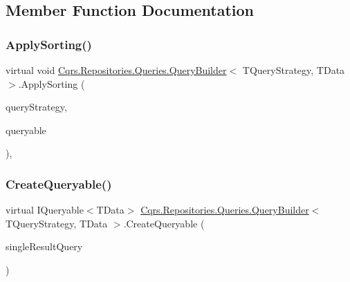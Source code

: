\subsection{Member Function Documentation}
\mbox{\label{classCqrs_1_1Repositories_1_1Queries_1_1QueryBuilder_aea4b78b2633babfaea0862f2a365c7d3}} 
\subsubsection{\texorpdfstring{Apply\+Sorting()}{ApplySorting()}}
{\footnotesize\ttfamily virtual void \hyperlink{classCqrs_1_1Repositories_1_1Queries_1_1QueryBuilder}{Cqrs.\+Repositories.\+Queries.\+Query\+Builder}$<$ T\+Query\+Strategy, T\+Data $>$.Apply\+Sorting (\begin{DoxyParamCaption}\item[{T\+Query\+Strategy}]{query\+Strategy,  }\item[{ref I\+Queryable$<$ T\+Data $>$}]{queryable }\end{DoxyParamCaption})\hspace{0.3cm}{\ttfamily [protected]}, {\ttfamily [virtual]}}

\mbox{\label{classCqrs_1_1Repositories_1_1Queries_1_1QueryBuilder_a6b103726f538e81ca0489a51b1aa3c88}} 
\subsubsection{\texorpdfstring{Create\+Queryable()}{CreateQueryable()}\hspace{0.1cm}{\footnotesize\ttfamily [1/2]}}
{\footnotesize\ttfamily virtual I\+Queryable$<$T\+Data$>$ \hyperlink{classCqrs_1_1Repositories_1_1Queries_1_1QueryBuilder}{Cqrs.\+Repositories.\+Queries.\+Query\+Builder}$<$ T\+Query\+Strategy, T\+Data $>$.Create\+Queryable (\begin{DoxyParamCaption}\item[{\hyperlink{interfaceCqrs_1_1Repositories_1_1Queries_1_1ISingleResultQuery}{I\+Single\+Result\+Query}$<$ T\+Query\+Strategy, T\+Data $>$}]{single\+Result\+Query }\end{DoxyParamCaption})\hspace{0.3cm}{\ttfamily [virtual]}}



